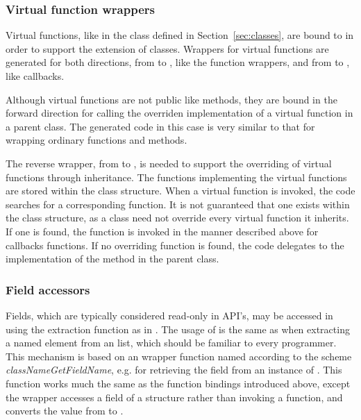 \documentclass[article,shortnames]{jss}
\begin{document}


\subsubsection{Virtual function wrappers}
Virtual functions, like  in the
 class defined in Section~\ref{sec:classes}, are bound to  in order to support
the extension of  classes. Wrappers for virtual functions
are generated for both directions, from  to ,
like the function wrappers, and from  to ,
like callbacks. 

Although virtual functions are not public like methods, they are bound
in the forward direction for calling the overriden implementation of a
virtual function in a parent class.  The generated code in this case
is very similar to that for wrapping ordinary functions and methods.

The reverse wrapper, from  to , is needed to
support the overriding of virtual functions through inheritance. The
 functions implementing the virtual functions are stored
within the  class structure. When a virtual function is
invoked, the code searches for a corresponding  function.
It is not guaranteed that one exists within the class structure, as a
class need not override every virtual function it inherits. If one is
found, the  function is invoked in the manner described
above for callbacks functions. If no overriding function is found, the
code delegates to the implementation of the method in the parent
class.

\subsubsection{Field accessors}

Fields, which are typically considered read-only in
 API's, may be accessed in  using the
extraction function \code{[[} as in . The usage of
\code{[[} is the same as when extracting a named element from an
 list, which should be familiar to every
 programmer. 
This mechanism is based on an 
wrapper function named according to the scheme
\emph{classNameGetFieldName}, e.g.  for
retrieving the  field from an instance of
. %
This function works much the same as the function bindings introduced
above, except the  wrapper accesses a field of a
 structure rather than invoking a function, and converts
the value from  to .
\end{document}
